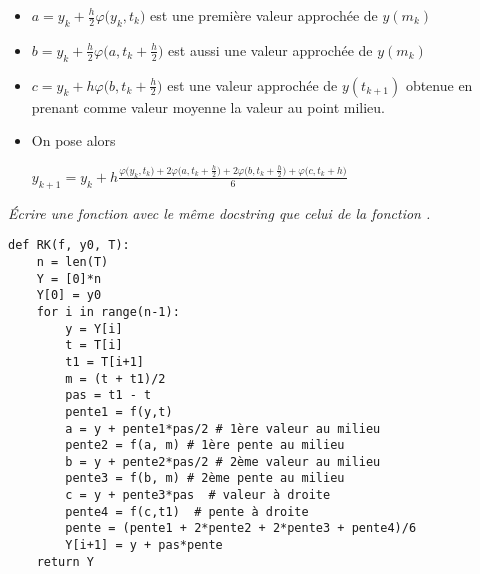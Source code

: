 \begin{itemize}
\item $a = y_k+\frac{h}2 \varphi\bigl(y_k,t_k\bigr)$ est une première valeur approchée de $y(m_k)$

\item $ b = y_k + \frac{h}2 \varphi\bigl(a, t_k+\frac h2\bigr)$ est aussi une valeur approchée de $y(m_k)$

\item $c = y_k + h \varphi\bigl(b, t_k+\frac h2\bigr)$ est une valeur approchée de $y(t_{k+1})$ obtenue en prenant comme valeur moyenne la valeur au point milieu.
\item On pose alors 

$\displaystyle  y_{k+1} = y_k+ h \frac{\varphi\bigl(y_k,t_k\bigr) + 2\varphi\bigl(a, t_k+\frac h2\bigr) + 2\varphi\bigl(b, t_k+\frac h2\bigr)  + \varphi\bigl(c, t_k+h\bigr)}6$
\end{itemize}
\begin{Exercise}\it
Écrire une fonction  avec le même docstring que celui de la fonction .
\end{Exercise}
\begin{Answer}
\begin{lstlisting}
def RK(f, y0, T):
    n = len(T)
    Y = [0]*n
    Y[0] = y0 
    for i in range(n-1): 
        y = Y[i]
        t = T[i]
        t1 = T[i+1]
        m = (t + t1)/2
        pas = t1 - t
        pente1 = f(y,t)
        a = y + pente1*pas/2 # 1ère valeur au milieu
        pente2 = f(a, m) # 1ère pente au milieu
        b = y + pente2*pas/2 # 2ème valeur au milieu
        pente3 = f(b, m) # 2ème pente au milieu
        c = y + pente3*pas  # valeur à droite
        pente4 = f(c,t1)  # pente à droite
        pente = (pente1 + 2*pente2 + 2*pente3 + pente4)/6
        Y[i+1] = y + pas*pente
    return Y
\end{lstlisting}
\end{Answer}
